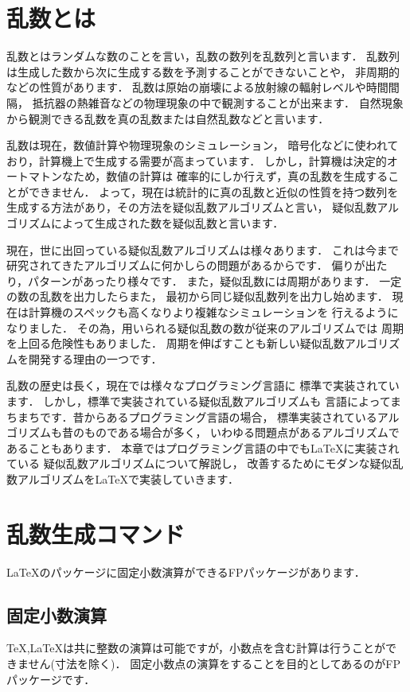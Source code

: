 \section{乱数とは}
乱数とはランダムな数のことを言い，乱数の数列を乱数列と言います．
乱数列は生成した数から次に生成する数を予測することができないことや，
非周期的などの性質があります．
乱数は原始の崩壊による放射線の輻射レベルや時間間隔，
抵抗器の熱雑音などの物理現象の中で観測することが出来ます．
自然現象から観測できる乱数を真の乱数または自然乱数などと言います．

乱数は現在，数値計算や物理現象のシミュレーション，
暗号化などに使われており，計算機上で生成する需要が高まっています．
しかし，計算機は決定的オートマトンなため，数値の計算は
確率的にしか行えず，真の乱数を生成することができません．
よって，現在は統計的に真の乱数と近似の性質を持つ数列を
生成する方法があり，その方法を疑似乱数アルゴリズムと言い，
疑似乱数アルゴリズムによって生成された数を疑似乱数と言います．

現在，世に出回っている疑似乱数アルゴリズムは様々あります．
これは今まで研究されてきたアルゴリズムに何かしらの問題があるからです．
偏りが出たり，パターンがあったり様々です．
また，疑似乱数には周期があります．
一定の数の乱数を出力したらまた，
最初から同じ疑似乱数列を出力し始めます．
現在は計算機のスペックも高くなりより複雑なシミュレーションを
行えるようになりました．
その為，用いられる疑似乱数の数が従来のアルゴリズムでは
周期を上回る危険性もありました．
周期を伸ばすことも新しい疑似乱数アルゴリズムを開発する理由の一つです．

乱数の歴史は長く，現在では様々なプログラミング言語に
標準で実装されています．
しかし，標準で実装されている疑似乱数アルゴリズムも
言語によってまちまちです．昔からあるプログラミング言語の場合，
標準実装されているアルゴリズムも昔のものである場合が多く，
いわゆる問題点があるアルゴリズムであることもあります．
本章ではプログラミング言語の中でも\LaTeX に実装されている
疑似乱数アルゴリズムについて解説し，
改善するためにモダンな疑似乱数アルゴリズムを\LaTeX で実装していきます．
\section{乱数生成コマンド}
\LaTeX のパッケージに固定小数演算ができるFPパッケージがあります．
\subsection{固定小数演算}
\TeX ,\LaTeX は共に整数の演算は可能ですが，小数点を含む計算は行うことができません(寸法を除く)．
固定小数点の演算をすることを目的としてあるのがFPパッケージです．
